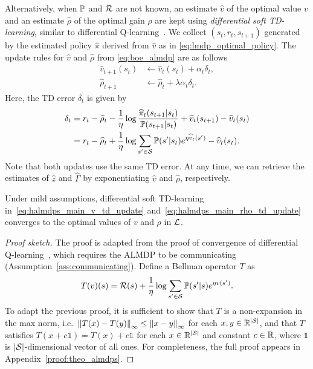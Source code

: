 Alternatively, when $\mathbb{P}$ and $\mathcal{R}$ are not known, an estimate $\widehat v$ of the optimal value $v$ and an estimate $\widehat\rho$ of the optimal gain $\rho$ are kept using \textit{differential soft TD-learning}, similar to differential Q-learning~\citep{Wan2021}. We collect $(s_t, r_t, s_{t+1})$ generated by the estimated policy $\widehat\pi$ derived from $\widehat v$ as in \eqref{eq:lmdp_optimal_policy}. The update rules for $\widehat v$ and $\widehat \rho$ from \eqref{eq:boe_almdp} are as follows
\begin{align}
    \widehat{v}_{t+1}(s_t) &\gets \widehat{v}_t(s_t) + \alpha_t \delta_t,
    \label{eq:halmdps_main_v_td_update}\\
    \widehat{\rho}_{t+1} &\gets \widehat{\rho}_t + \lambda \alpha_t \delta_t.\label{eq:halmdps_main_rho_td_update}
    \end{align}
Here, the TD error $\delta_t$ is given by
\begin{align*}
\delta_t &= r_t - \widehat{\rho}_t - \frac 1 \eta \log \frac {\widehat{\pi}_t(s_{t+1}|s_t)} {\mathbb{P}(s_{t+1}|s_t)} + \widehat{v}_t(s_{t+1}) - \widehat{v}_t(s_t)\\
 &= r_t - \widehat{\rho}_t + \frac 1 \eta \log \sum_{s'\in\mathcal{S}} \mathbb{P}(s'|s_t) e^{\eta \widehat{v}_t(s')} - \widehat{v}_t(s_t).
\end{align*}
Note that both updates use the same TD error. At any time, we can retrieve the estimates of $\widehat z$ and $\widehat\Gamma$ by exponentiating $\widehat v$ and $\widehat \rho$, respectively.


\begin{theorem}
    Under mild assumptions, differential soft TD-learning in~\eqref{eq:halmdps_main_v_td_update} and~\eqref{eq:halmdps_main_rho_td_update} converges to the optimal values of $v$ and $\rho$ in $\mathcal{L}$. \label{theo:almdps}
\end{theorem}

\begin{proof}[Proof sketch]
The proof is adapted from the proof of convergence of differential Q-learning~\cite{Abounadi2001,Wan2021}, which requires the ALMDP to be communicating (Assumption~\ref{ass:communicating}).
Define a Bellman operator $T$ as
\[
T(v)(s) = \mathcal{R}(s) + \frac 1 \eta \log \sum_{s'\in\mathcal{S}} \mathbb{P}(s'|s) e^{ \eta v(s') }.
\]
To adapt the previous proof, it is sufficient to show that $T$ is a non-expansion in the max norm, i.e.~$\left\|T(x)-T(y)\right\|_\infty \leq \left\|x - y\right\|_\infty$ for each $x, y\in\mathbb{R}^{|\mathcal{S}|}$, and that $T$ satisfies $T(x + c\mathds{1}) = T(x) + c\mathds{1}$ for each $x\in\mathbb{R}^{|\mathcal{S}|}$ and constant $c\in\mathbb{R}$, where $\mathds{1}$ is $|\mathcal{S}|$-dimensional vector of all ones.
For completeness, the full proof appears in Appendix~\ref{proof:theo_almdps}.
\end{proof}


